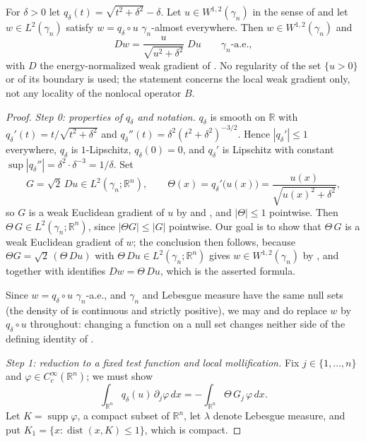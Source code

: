 \begin{lemma}
For $\delta > 0$ let $q_\delta(t) = \sqrt{t^2+\delta^2} - \delta$.  Let
$u \in W^{1,2}(\gamma_n)$ in the sense of  and let
$w \in L^2(\gamma_n)$ satisfy $w = q_\delta \circ u$ $\gamma_n$-almost
everywhere.  Then $w \in W^{1,2}(\gamma_n)$ and
\[
  Dw = \frac{u}{\sqrt{u^2+\delta^2}}\; Du
  \qquad \gamma_n\text{-a.e.},
\]
with $D$ the energy-normalized weak gradient of .  No regularity
of the set $\{u>0\}$ or of its boundary is used; the statement concerns the local
weak gradient only, not any locality of the nonlocal operator $B$.
\end{lemma}
\begin{proof}
\emph{Step 0: properties of $q_\delta$ and notation.}
$q_\delta$ is smooth on $\mathbb{R}$ with
$q_\delta'(t) = t/\sqrt{t^2+\delta^2}$ and
$q_\delta''(t) = \delta^2 (t^2+\delta^2)^{-3/2}$.  Hence
$|q_\delta'| \leq 1$ everywhere, $q_\delta$ is $1$-Lipschitz, $q_\delta(0) = 0$,
and $q_\delta'$ is Lipschitz with constant
$\sup|q_\delta''| = \delta^2\cdot\delta^{-3} = 1/\delta$.  Set
\[
  G = \sqrt2\, Du \in L^2(\gamma_n;\mathbb{R}^n),
  \qquad
  \Theta(x) = q_\delta'\bigl(u(x)\bigr) = \frac{u(x)}{\sqrt{u(x)^2+\delta^2}} ,
\]
so $G$ is a weak Euclidean gradient of $u$ by  and
, and $|\Theta| \leq 1$ pointwise.  Then
$\Theta\, G \in L^2(\gamma_n;\mathbb{R}^n)$, since $|\Theta G| \leq |G|$
pointwise.  Our goal is to show that $\Theta\,G$ is a weak Euclidean gradient of
$w$; the conclusion then follows, because $\Theta G = \sqrt2\,(\Theta\, Du)$ with
$\Theta\,Du \in L^2(\gamma_n;\mathbb{R}^n)$ gives $w \in W^{1,2}(\gamma_n)$ by
, and  together with
 identifies $Dw = \Theta\,Du$, which is the asserted
formula.

Since $w = q_\delta\circ u$ $\gamma_n$-a.e., and $\gamma_n$ and Lebesgue measure
have the same null sets (the density of  is continuous and
strictly positive), we may and do replace $w$ by $q_\delta\circ u$ throughout:
changing a function on a null set changes neither side of the defining identity
of .

\emph{Step 1: reduction to a fixed test function and local mollification.}
Fix $j \in \{1,\ldots,n\}$ and $\varphi \in C_c^\infty(\mathbb{R}^n)$; we must show
\begin{equation*}
  \int_{\mathbb{R}^n} q_\delta(u)\, \partial_j \varphi\, dx
    = -\int_{\mathbb{R}^n} \Theta\, G_j\, \varphi \, dx . \tag{1}
\end{equation*}
Let $K = \operatorname{supp}\varphi$, a compact subset of $\mathbb{R}^n$, let
$\lambda$ denote Lebesgue measure, and put
$K_1 = \{x : \operatorname{dist}(x,K) \leq 1\}$, which is compact.


\end{proof}
